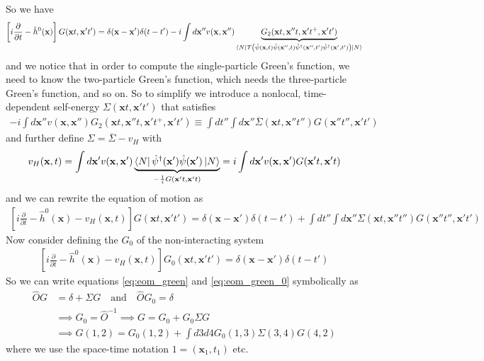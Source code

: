 So we have
\begin{align}
  \left[ i \frac{\partial}{\partial t} - \hat{h}^0(\mathbf{x}) \right] G(\mathbf{x}t, \mathbf{x}'t') = \delta(\mathbf{x}-\mathbf{x}') \delta(t-t') - i \int d\mathbf{x}'' v(\mathbf{x},\mathbf{x}'') \underbrace{G_2(\mathbf{x}t, \mathbf{x}''t, \mathbf{x}'t^+ , \mathbf{x}'t')}_{\bra{N}\mathcal{T}\left(\hat{\psi}(\mathbf{x},t)\hat{\psi}(\mathbf{x}'',t)\hat{\psi}^\dagger(\mathbf{x}'',t')\hat{\psi}^\dagger(\mathbf{x}',t')\right)\ket{N}}
\end{align}
and we notice that in order to compute the single-particle Green's function, we need to know the two-particle Green's function, which needs the three-particle Green's function, and so on. So to simplify we introduce a nonlocal, time-dependent self-energy $\Sigma(\mathbf{x}t, \mathbf{x}'t')$ that satisfies
\begin{align}
  - i \int d\mathbf{x}'' v(\mathbf{x}, \mathbf{x}'') G_2(\mathbf{x}t, \mathbf{x}''t, \mathbf{x}'t^+ , \mathbf{x}'t') \equiv \int dt'' \int d\mathbf{x}'' \overline{\Sigma}(\mathbf{x} t , \mathbf{x}'' t'' ) G(\mathbf{x}''t'', \mathbf{x}'t')
\end{align}
and further define $\Sigma = \overline{\Sigma} - v_H$ with
\begin{align}
  v_H(\mathbf{x},t) = \int d\mathbf{x}' v(\mathbf{x}, \mathbf{x}') \underbrace{\bra{N} \hat{\psi}^\dagger(\mathbf{x}') \hat{\psi}(\mathbf{x}') \ket{N}}_{-\frac{1}{i}G(\mathbf{x}'t, \mathbf{x}'t)} = i \int d\mathbf{x}' v(\mathbf{x}, \mathbf{x}') G(\mathbf{x}'t, \mathbf{x}'t)
  \label{eq:hartree}
\end{align}
and we can rewrite the equation of motion as
\begin{align}
  \left[ i \frac{\partial}{\partial t} - \hat{h}^0(\mathbf{x}) - v_H(\mathbf{x},t) \right] G(\mathbf{x}t, \mathbf{x}'t') = \delta(\mathbf{x}-\mathbf{x}') \delta(t-t') + \int dt'' \int d\mathbf{x}'' \Sigma(\mathbf{x}t, \mathbf{x}''t'') G(\mathbf{x}''t'', \mathbf{x}'t')
  \label{eq:eom_green}
\end{align}
Now consider defining the $G_0$ of the non-interacting system
\begin{align}
    \left[ i \frac{\partial}{\partial t} - \hat{h}^0(\mathbf{x}) - v_H(\mathbf{x},t) \right] G_0(\mathbf{x}t, \mathbf{x}'t') = \delta(\mathbf{x}-\mathbf{x}') \delta(t-t')
    \label{eq:eom_green_0}
\end{align}
So we can write equations \ref{eq:eom_green} and \ref{eq:eom_green_0} symbolically as
\begin{align}
  \hat{O} G &= \delta + \Sigma G \quad \text{and} \quad \hat{O} G_0 = \delta \\
  &\implies G_0 = \hat{O}^{-1} \implies G = G_0 + G_0 \Sigma G \\
  &\implies G(1,2) = G_0(1,2) + \int d3 d4 G_0(1,3) \Sigma(3,4) G(4,2)
\end{align}
where we use the space-time notation $1 = (\mathbf{x}_1,t_1)$ etc.

